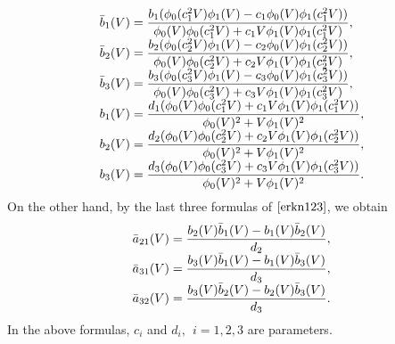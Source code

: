 \documentclass{article}
\begin{document}
\begin{equation}
\begin{array}
[c]{ll}
\bar{b}_{1}(V)=\dfrac{b_{1}(\phi_{0}(c_{1}^2V)\phi_{1}(V)-c_{1}\phi_{0}(V)\phi_{1}(c_{1}^2V))}{\phi_{0}(V)\phi_{0}(c_{1}^2V)+c_{1}V\phi_{1}(V)\phi_{1}(c_{1}^2V)},\\
\bar{b}_{2}(V)=\dfrac{b_{2}(\phi_{0}(c_{2}^2V)\phi_{1}(V)-c_{2}\phi_{0}(V)\phi_{1}(c_{2}^2V))}{\phi_{0}(V)\phi_{0}(c_{2}^2V)+c_{2}V\phi_{1}(V)\phi_{1}(c_{2}^2V)},\\
\bar{b}_{3}(V)=\dfrac{b_{3}(\phi_{0}(c_{3}^2V)\phi_{1}(V)-c_{3}\phi_{0}(V)\phi_{1}(c_{3}^2V))}{\phi_{0}(V)\phi_{0}(c_{3}^2V)+c_{3}V\phi_{1}(V)\phi_{1}(c_{3}^2V)},\\
b_{1}(V)=\dfrac{d_{1}(\phi_{0}(V)\phi_{0}(c_{1}^2V)+c_{1}V\phi_{1}(V)\phi_{1}(c_{1}^2V))}{\phi_{0}(V)^2+V\phi_{1}(V)^2},\\
b_{2}(V)=\dfrac{d_{2}(\phi_{0}(V)\phi_{0}(c_{2}^2V)+c_{2}V\phi_{1}(V)\phi_{1}(c_{2}^2V))}{\phi_{0}(V)^2+V\phi_{1}(V)^2},\\
b_{3}(V)=\dfrac{d_{3}(\phi_{0}(V)\phi_{0}(c_{3}^2V)+c_{3}V\phi_{1}(V)\phi_{1}(c_{3}^2V))}{\phi_{0}(V)^2+V\phi_{1}(V)^2}.
\end{array}
  \label{scvg}%
\end{equation}
 On the other hand, by the last three formulas of
$\eqref{erkn123}$, we   obtain
\begin{equation}
\begin{array}
[c]{ll}
\bar{a}_{21}(V)=\dfrac{b_{2}(V)\bar{b}_{1}(V)-b_{1}(V)\bar{b}_{2}(V)}{d_{2}},\\
\bar{a}_{31}(V)=\dfrac{b_{3}(V)\bar{b}_{1}(V)-b_{1}(V)\bar{b}_{3}(V)}{d_{3}},\\
\bar{a}_{32}(V)=\dfrac{b_{3}(V)\bar{b}_{2}(V)-b_{2}(V)\bar{b}_{3}(V)}{d_{3}}.
\end{array}
  \label{ekrnA}%
\end{equation}
In the above formulas, $c_{i}$ and $d_{i},\ \ i=1,2,3 $ are
parameters.
\end{document}
